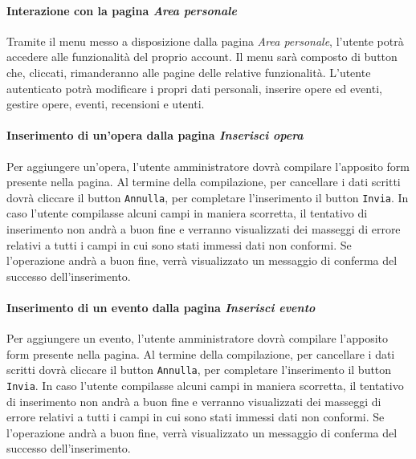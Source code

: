 \paragraph{Interazione con la pagina \textit{Area personale}}
\label{analisi-casi-uso-attori-principali-utente-amministratore-3}
Tramite il menu messo a disposizione dalla pagina \textit{Area personale}, l'utente potrà accedere alle funzionalità del proprio account. Il menu sarà composto di button che, cliccati, rimanderanno alle pagine delle relative funzionalità. L'utente autenticato potrà modificare i propri dati personali, inserire opere ed eventi, gestire opere, eventi, recensioni e utenti.


\paragraph{Inserimento di un'opera dalla pagina \textit{Inserisci opera}}
\label{analisi-casi-uso-attori-principali-utente-amministratore-4}
Per aggiungere un'opera, l'utente amministratore dovrà compilare l'apposito form presente nella pagina. Al termine della compilazione, per cancellare i dati scritti dovrà cliccare il button \texttt{Annulla}, per completare l'inserimento il button \texttt{Invia}. In caso l'utente compilasse alcuni campi in maniera scorretta, il tentativo di inserimento non andrà a buon fine e verranno visualizzati dei masseggi di errore relativi a tutti i campi in cui sono stati immessi dati non conformi. Se l'operazione andrà a buon fine, verrà visualizzato un messaggio di conferma del successo dell'inserimento.


\paragraph{Inserimento di un evento dalla pagina \textit{Inserisci evento}}
\label{analisi-casi-uso-attori-principali-utente-amministratore-5}
Per aggiungere un evento, l'utente amministratore dovrà compilare l'apposito form presente nella pagina. Al termine della compilazione, per cancellare i dati scritti dovrà cliccare il button \texttt{Annulla}, per completare l'inserimento il button \texttt{Invia}. In caso l'utente compilasse alcuni campi in maniera scorretta, il tentativo di inserimento non andrà a buon fine e verranno visualizzati dei masseggi di errore relativi a tutti i campi in cui sono stati immessi dati non conformi. Se l'operazione andrà a buon fine, verrà visualizzato un messaggio di conferma del successo dell'inserimento.


